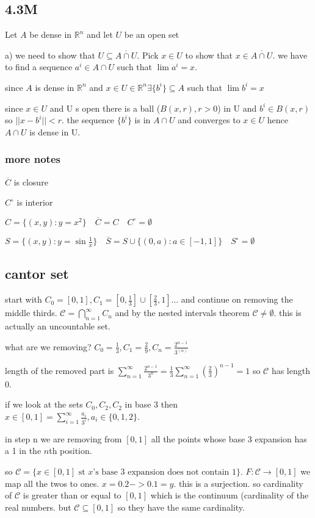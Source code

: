 \documentclass[letterpaper]{article}
\begin{document}
\subsection*{4.3M}
Let $A$ be dense in $\mathbb{R}^n$ and let $U$ be an open set


a) we need to show that $U\subseteq \overline{A\cap U}$. Pick $x\in U$ to show that $x\in \overline{A\cap U}$. we have to find a sequence $a^i\in A\cap U$ such that $\lim a^i=x$.

since $A$ is dense in $\mathbb{R}^n$ and $x\in U\in\mathbb{R}^n\exists\{b^i\}\subseteq A$ such that $\lim b^i=x$

since $x\in U$ and U s open there is a ball ($B(x,r),r>0$) in U and $b^i\in B(x,r)$ so $||x-b^i||<r$. the sequence $\{b^i\}$ is in $A\cap U$ and converges to $x\in U$ hence $A\cap U$ is dense in U.

\subsubsection*{more notes}
$\overline{C}$ is closure

$C^\circ$ is interior

$C=\{(x,y):y=x^2\}\quad \overline{C}=C\quad C^\circ=\emptyset$

$S=\{(x,y):y=\sin\frac{1}{x}\}\quad \overline{S}=S\cup\{(0,a):a\in[-1,1]\}\quad S^\circ=\emptyset$

\subsection*{cantor set}
start with $C_0=[0,1], C_1=[0,\frac{1}{3}]\cup[\frac{2}{3},1]\dots$ and continue on removing the middle thirds.
$\mathcal{C}=\bigcap_{n=1}^\infty C_n$ and by the nested intervals theorem $\mathcal{C}\ne\emptyset$. this is actually  an uncountable set.

what are we removing? $C_0=\frac{1}{3}, C_1=\frac{2}{9}, C_n=\frac{2^{n-1}}{3^(n)}$

length of the removed part is $\sum\limits_{n=1}^\infty{\frac{2^{n-1}}{3^{n}}}=\frac{1}{3}\sum\limits_{n=1}^\infty{\left(\frac{2}{3}\right)^{n-1}}=1$ so $\mathcal{C}$ has length 0.

if we look at the sets $C_0,C_2,C_2$ in base 3 then $x\in[0,1]=\sum\limits_{i=1}^\infty{\frac{a_i}{3^i}},a_i\in\{0,1,2\}$.

in step n we are removing from $[0,1]$ all the points whose base 3 expansion has a 1 in the $n$th position.

so $\mathcal{C}=\{x\in[0,1]\text{ st $x$'s base 3 expansion does not contain 1}\}$. $F:\mathcal{C}\to[0,1]$ we map all the twos to ones. $x=0.2->0.1=y$. this is a surjection. so cardinality of $\mathcal{C}$ is greater than or equal to $[0,1]$ which is the continuum (cardinality of the real numbers. but $\mathcal{C}\subseteq[0,1]$ so they have the same cardinality.
\end{document}
